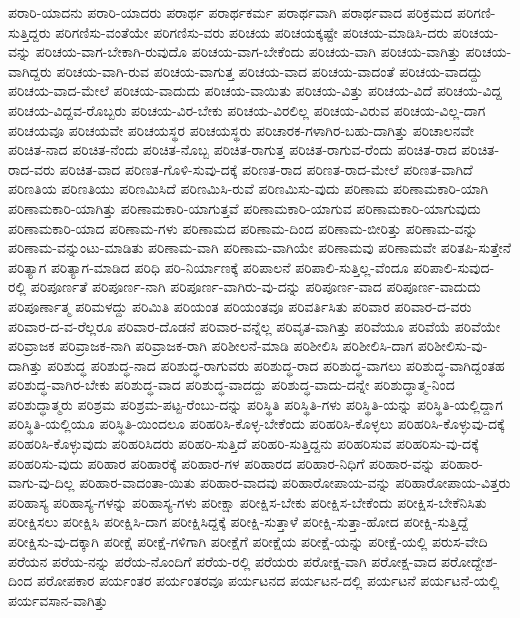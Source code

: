 {ಪರಾರಿ-ಯಾದನು
ಪರಾರಿ-ಯಾದರು
ಪರಾರ್ಥ
ಪರಾರ್ಥಕರ್ಮ
ಪರಾರ್ಥವಾಗಿ
ಪರಾರ್ಥವಾದ
ಪರಿಕ್ರಮದ
ಪರಿಗಣಿ-ಸುತ್ತಿದ್ದರು
ಪರಿಗಣಿಸು-ವಂತೆಯೇ
ಪರಿಗಣಿಸು-ವರು
ಪರಿಚಯ
ಪರಿಚಯಕ್ಕಷ್ಟೇ
ಪರಿಚಯ-ಮಾಡಿಸಿ-ದರು
ಪರಿಚಯ-ವನ್ನು
ಪರಿಚಯ-ವಾಗ-ಬೇಕಾಗಿ-ರುವುದೊ
ಪರಿಚಯ-ವಾಗ-ಬೇಕೆಂದು
ಪರಿಚಯ-ವಾಗಿ
ಪರಿಚಯ-ವಾಗಿತ್ತು
ಪರಿಚಯ-ವಾಗಿದ್ದರು
ಪರಿಚಯ-ವಾಗಿ-ರುವ
ಪರಿಚಯ-ವಾಗುತ್ತ
ಪರಿಚಯ-ವಾದ
ಪರಿಚಯ-ವಾದಂತೆ
ಪರಿಚಯ-ವಾದದ್ದು
ಪರಿಚಯ-ವಾದ-ಮೇಲೆ
ಪರಿಚಯ-ವಾದುದು
ಪರಿಚಯ-ವಾಯಿತು
ಪರಿಚಯ-ವಿತ್ತು
ಪರಿಚಯ-ವಿದೆ
ಪರಿಚಯ-ವಿದ್ದ
ಪರಿಚಯ-ವಿದ್ದವ-ರೊಬ್ಬರು
ಪರಿಚಯ-ವಿರ-ಬೇಕು
ಪರಿಚಯ-ವಿರಲಿಲ್ಲ
ಪರಿಚಯ-ವಿರುವ
ಪರಿಚಯ-ವಿಲ್ಲ-ದಾಗ
ಪರಿಚಯವೂ
ಪರಿಚಯವೇ
ಪರಿಚಯಸ್ಥರ
ಪರಿಚಯಸ್ಥರು
ಪರಿಚಾರಕ-ಗಳಾಗಿರ-ಬಹು-ದಾಗಿತ್ತು
ಪರಿಚಾಲನವೇ
ಪರಿಚಿತ-ನಾದ
ಪರಿಚಿತ-ನೆಂದು
ಪರಿಚಿತ-ನೊಬ್ಬ
ಪರಿಚಿತ-ರಾಗುತ್ತ
ಪರಿಚಿತ-ರಾಗುವ-ರೆಂದು
ಪರಿಚಿತ-ರಾದ
ಪರಿಚಿತ-ರಾದ-ವರು
ಪರಿಚಿತ-ವಾದ
ಪರಿಣತ-ಗೊಳಿ-ಸುವು-ದಕ್ಕೆ
ಪರಿಣತ-ರಾದ
ಪರಿಣತ-ರಾದ-ಮೇಲೆ
ಪರಿಣತ-ವಾಗಿದೆ
ಪರಿಣತಿಯ
ಪರಿಣತಿಯು
ಪರಿಣಮಿಸಿದೆ
ಪರಿಣಮಿಸಿ-ರುವೆ
ಪರಿಣಮಿಸು-ವುದು
ಪರಿಣಾಮ
ಪರಿಣಾಮಕಾರಿ-ಯಾಗಿ
ಪರಿಣಾಮಕಾರಿ-ಯಾಗಿತ್ತು
ಪರಿಣಾಮಕಾರಿ-ಯಾಗುತ್ತವೆ
ಪರಿಣಾಮಕಾರಿ-ಯಾಗುವ
ಪರಿಣಾಮಕಾರಿ-ಯಾಗುವುದು
ಪರಿಣಾಮಕಾರಿ-ಯಾದ
ಪರಿಣಾಮ-ಗಳು
ಪರಿಣಾಮದ
ಪರಿಣಾಮ-ದಿಂದ
ಪರಿಣಾಮ-ಬೀರಿತ್ತು
ಪರಿಣಾಮ-ವನ್ನು
ಪರಿಣಾಮ-ವನ್ನುಂಟು-ಮಾಡಿತು
ಪರಿಣಾಮ-ವಾಗಿ
ಪರಿಣಾಮ-ವಾಗಿಯೇ
ಪರಿಣಾಮವು
ಪರಿಣಾಮವೇ
ಪರಿತಪಿ-ಸುತ್ತೇನೆ
ಪರಿತ್ಯಾಗ
ಪರಿತ್ಯಾಗ-ಮಾಡಿದ
ಪರಿಧಿ
ಪರಿ-ನಿರ್ಯಾಣಕ್ಕೆ
ಪರಿಪಾಲನೆ
ಪರಿಪಾಲಿ-ಸುತ್ತಿಲ್ಲ-ವೆಂದೂ
ಪರಿಪಾಲಿ-ಸುವುದ-ರಲ್ಲಿ
ಪರಿಪೂರ್ಣತೆ
ಪರಿಪೂರ್ಣ-ನಾಗಿ
ಪರಿಪೂರ್ಣ-ವಾಗಿರು-ವು-ದನ್ನು
ಪರಿಪೂರ್ಣ-ವಾದ
ಪರಿಪೂರ್ಣ-ವಾದುದು
ಪರಿಪೂರ್ಣಾತ್ಮ
ಪರಿಮಳದ್ದು
ಪರಿಮಿತಿ
ಪರಿಯಂತ
ಪರಿಯಂತವೂ
ಪರಿವರ್ತಿಸಿತು
ಪರಿವಾರ
ಪರಿವಾರ-ದ-ವರು
ಪರಿವಾರ-ದ-ವ-ರೆಲ್ಲರೂ
ಪರಿವಾರ-ದೊಡನೆ
ಪರಿವಾರ-ವನ್ನೆಲ್ಲ
ಪರಿವೃತ-ವಾಗಿತ್ತು
ಪರಿವೆಯೂ
ಪರಿವೆಯೆ
ಪರಿವೆಯೇ
ಪರಿವ್ರಾಜಕ
ಪರಿವ್ರಾಜಕ-ನಾಗಿ
ಪರಿವ್ರಾಜಕ-ರಾಗಿ
ಪರಿಶೀಲನೆ-ಮಾಡಿ
ಪರಿಶೀಲಿಸಿ
ಪರಿಶೀಲಿಸಿ-ದಾಗ
ಪರಿಶೀಲಿಸು-ವು-ದಾಗಿತ್ತು
ಪರಿಶುದ್ಧ
ಪರಿಶುದ್ಧ-ನಾದ
ಪರಿಶುದ್ಧ-ರಾಗುವರು
ಪರಿಶುದ್ಧ-ರಾದ
ಪರಿಶುದ್ಧ-ವಾಗಲು
ಪರಿಶುದ್ಧ-ವಾಗಿದ್ದಂತಹ
ಪರಿಶುದ್ಧ-ವಾಗಿರ-ಬೇಕು
ಪರಿಶುದ್ಧ-ವಾದ
ಪರಿಶುದ್ಧ-ವಾದದ್ದು
ಪರಿಶುದ್ಧ-ವಾದು-ದನ್ನೇ
ಪರಿಶುದ್ಧಾತ್ಮ-ನಿಂದ
ಪರಿಶುದ್ಧಾತ್ಮರು
ಪರಿಶ್ರಮ
ಪರಿಶ್ರಮ-ಪಟ್ಟ-ರೆಂಬು-ದನ್ನು
ಪರಿಸ್ಥಿತಿ
ಪರಿಸ್ಥಿತಿ-ಗಳು
ಪರಿಸ್ಥಿತಿ-ಯನ್ನು
ಪರಿಸ್ಥಿತಿ-ಯಲ್ಲಿದ್ದಾಗ
ಪರಿಸ್ಥಿತಿ-ಯಲ್ಲಿಯೂ
ಪರಿಸ್ಥಿತಿ-ಯಿಂದಲೂ
ಪರಿಹರಿಸಿ-ಕೊಳ್ಳ-ಬೇಕೆಂದು
ಪರಿಹರಿಸಿ-ಕೊಳ್ಳಲು
ಪರಿಹರಿಸಿ-ಕೊಳ್ಳುವು-ದಕ್ಕೆ
ಪರಿಹರಿಸಿ-ಕೊಳ್ಳುವುದು
ಪರಿಹರಿಸಿದರು
ಪರಿಹರಿ-ಸುತ್ತಿದೆ
ಪರಿಹರಿ-ಸುತ್ತಿದ್ದನು
ಪರಿಹರಿಸುವ
ಪರಿಹರಿಸು-ವು-ದಕ್ಕೆ
ಪರಿಹರಿಸು-ವುದು
ಪರಿಹಾರ
ಪರಿಹಾರಕ್ಕೆ
ಪರಿಹಾರ-ಗಳ
ಪರಿಹಾರದ
ಪರಿಹಾರ-ನಿಧಿಗೆ
ಪರಿಹಾರ-ವನ್ನು
ಪರಿಹಾರ-ವಾಗು-ವು-ದಿಲ್ಲ
ಪರಿಹಾರ-ವಾದಂತಾ-ಯಿತು
ಪರಿಹಾರ-ವಾದವು
ಪರಿಹಾರೋಪಾಯ-ವನ್ನು
ಪರಿಹಾರೋಪಾಯ-ವಿತ್ತರು
ಪರಿಹಾಸ್ಯ
ಪರಿಹಾಸ್ಯ-ಗಳನ್ನು
ಪರಿಹಾಸ್ಯ-ಗಳು
ಪರೀಕ್ಷಾ
ಪರೀಕ್ಷಿಸ-ಬೇಕು
ಪರೀಕ್ಷಿಸ-ಬೇಕೆಂದು
ಪರೀಕ್ಷಿಸ-ಬೇಕೆನಿಸಿತು
ಪರೀಕ್ಷಿಸಲು
ಪರೀಕ್ಷಿಸಿ
ಪರೀಕ್ಷಿಸಿ-ದಾಗ
ಪರೀಕ್ಷಿಸಿದ್ದಕ್ಕೆ
ಪರೀಕ್ಷಿ-ಸುತ್ತಾಳೆ
ಪರೀಕ್ಷಿ-ಸುತ್ತಾ-ಹೋದ
ಪರೀಕ್ಷಿ-ಸುತ್ತಿದ್ದೆ
ಪರೀಕ್ಷಿಸು-ವು-ದಕ್ಕಾಗಿ
ಪರೀಕ್ಷೆ
ಪರೀಕ್ಷೆ-ಗಳಿಗಾಗಿ
ಪರೀಕ್ಷೆಗೆ
ಪರೀಕ್ಷೆಯ
ಪರೀಕ್ಷೆ-ಯನ್ನು
ಪರೀಕ್ಷೆ-ಯಲ್ಲಿ
ಪರುಸ-ವೇದಿ
ಪರೆಯನ
ಪರೆಯ-ನನ್ನು
ಪರೆಯ-ನೊಂದಿಗೆ
ಪರೆಯ-ರಲ್ಲಿ
ಪರೆಯರು
ಪರೋಕ್ಷ-ವಾಗಿ
ಪರೋಕ್ಷ-ವಾದ
ಪರೋದ್ದೇಶ-ದಿಂದ
ಪರೋಪಕಾರ
ಪರ್ಯಂತರ
ಪರ್ಯಂತರವೂ
ಪರ್ಯಟನದ
ಪರ್ಯಟನ-ದಲ್ಲಿ
ಪರ್ಯಟನೆ
ಪರ್ಯಟನೆ-ಯಲ್ಲಿ
ಪರ್ಯವಸಾನ-ವಾಗಿತ್ತು
}
